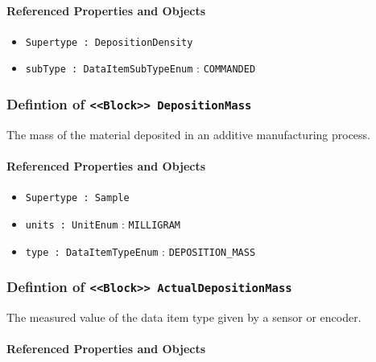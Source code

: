 \FloatBarrier
\paragraph{Referenced Properties and Objects}

\begin{itemize}
\item \texttt{Supertype : DepositionDensity}

\item \texttt{subType : DataItemSubTypeEnum} : \texttt{COMMANDED}

\end{itemize}
\FloatBarrier
\subsubsection{Defintion of \texttt{<<Block>> DepositionMass}}
  \label{type:DepositionMass}

\FloatBarrier

The mass of the material deposited in an additive manufacturing process.

\FloatBarrier
\paragraph{Referenced Properties and Objects}

\begin{itemize}
\item \texttt{Supertype : Sample}

\item \texttt{units : UnitEnum} : \texttt{MILLIGRAM}

\item \texttt{type : DataItemTypeEnum} : \texttt{DEPOSITION_MASS}

\end{itemize}
\FloatBarrier
\subsubsection{Defintion of \texttt{<<Block>> ActualDepositionMass}}
  \label{type:ActualDepositionMass}

\FloatBarrier

The measured value of the data item type given by a sensor or encoder.

\FloatBarrier
\paragraph{Referenced Properties and Objects}

